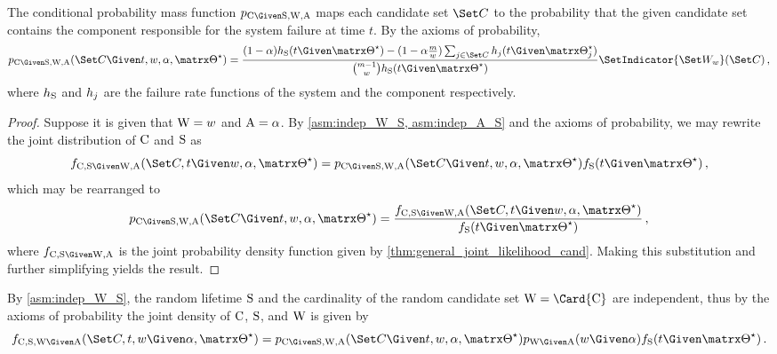 \documentclass[../main.tex]{subfiles}
\begin{document}
\begin{corollary}
	\label{def:general_cond_cand_probability_alpha}
	The conditional probability mass function $\pmf_{\rvcand \Given \sv, \RV{W}, \RV{A}}$ maps each candidate set $\cand$ to the probability that the given candidate set contains the component responsible for the system failure at time $t$.
	By the axioms of probability,
	\begin{equation}
	\begin{split}
	\label{eq:general_cond_cand_probability_alpha}
	\pmf_{\rvcand \Given \sv, \RV{W}, \RV{A}}(\cand \Given t, w, \alpha, \tparam\sysparam) =
	\frac{(1-\alpha) \haz_{\sv}(t \Given \tparam\sysparam) - (1-\alpha\frac{m}{w}) \sum_{j \in \cand} \haz_j(t \Given \tparam\sysparam_j)}{\binom{m-1}{w} \haz_{\sv}(t \Given \tparam\sysparam)}
	\SetIndicator{\candsw{w}}(\cand)\,,
	\end{split}
	\end{equation}
	where $h_{\mathrm{S}}$ and $h_j$ are the failure rate functions of the system 
	and the \jth component respectively.
\end{corollary}
\begin{proof}
Suppose it is given that $\mathrm{W} = w$ and $\mathrm{A} = \alpha$.
By \cref{asm:indep_W_S, asm:indep_A_S} and the axioms of probability, we may rewrite the joint distribution of $\mathrm{C}$ and $\mathrm{S}$ as
\begin{equation}
\pdf_{\rvcand,\sv \Given \RV{W}, \RV{A}}(\cand, t \Given w, \alpha, \tparam\sysparam) =
\pmf_{\rvcand \Given \sv, \RV{W}, \RV{A}}(\cand \Given t, w, \alpha, \tparam\sysparam) \spdf(t \Given \tparam\sysparam)\,,
\end{equation}
which may be rearranged to
\begin{equation}
\pmf_{\rvcand \Given \sv, \RV{W}, \RV{A}}(\cand \Given t, w, \alpha, \tparam\sysparam) = \frac
{
	\pdf_{\rvcand, \sv \Given \RV{W}, \RV{A}}(\cand, t \Given w, \alpha, \tparam\sysparam)
}
{
	\spdf(t \Given \tparam\sysparam)
}\,,
\end{equation}
where $\pdf_{\rvcand, \sv \Given \RV{W}, \RV{A}}$ is the joint probability density function given by \cref{thm:general_joint_likelihood_cand}.
Making this substitution and further simplifying yields the result.
\end{proof}

By \cref{asm:indep_W_S}, the random lifetime $\mathrm{S}$ and the cardinality of the random candidate set $\RV{W} = \Card{\rvcand}$ are independent, thus by the axioms of probability the joint density of $\mathrm{C}$, $\mathrm{S}$, and $\mathrm{W}$ is given by
\begin{equation}
\pdf_{\rvcand, \sv, \RV{W} \Given \RV{A}}(\cand, t, w \Given \alpha, \tparam\sysparam) = \pmf_{\rvcand \Given \sv, \RV{W}, \RV{A}}(\cand \Given t, w, \alpha, \tparam\sysparam) \pmf_{\RV{W} \Given \RV{A}}(w \Given \alpha) \spdf(t \Given \tparam\sysparam)\,.
\end{equation}
\end{document}
